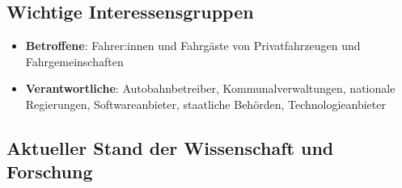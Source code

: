 \documentclass[
]{book}
\providecommand{\tightlist}{%
  \setlength{\itemsep}{0pt}\setlength{\parskip}{0pt}}
\begin{document}
\hypertarget{wichtige-interessensgruppen-4}{%
\subsection*{Wichtige Interessensgruppen}\label{wichtige-interessensgruppen-4}}

\begin{itemize}
\tightlist
\item
  \textbf{Betroffene}: Fahrer:innen und Fahrgäste von Privatfahrzeugen und Fahrgemeinschaften
\item
  \textbf{Verantwortliche}: Autobahnbetreiber, Kommunalverwaltungen, nationale Regierungen, Softwareanbieter, staatliche Behörden, Technologieanbieter
\end{itemize}

\hypertarget{aktueller-stand-der-wissenschaft-und-forschung-4}{%
\subsection*{Aktueller Stand der Wissenschaft und Forschung}\label{aktueller-stand-der-wissenschaft-und-forschung-4}}
\end{document}
